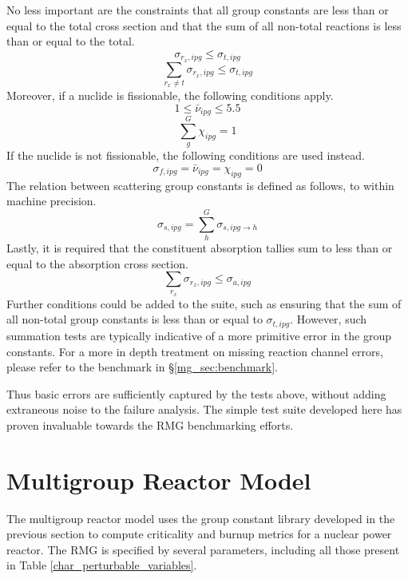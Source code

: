 No less important are the constraints that all group constants are less than or equal to 
the total cross section and that the sum of all non-total reactions is less than or equal
to the total.
\begin{equation}
\label{tot_xs_ut}
\sigma_{r_x,ipg} \le \sigma_{t,ipg}
\end{equation}
\begin{equation}
\label{tot_xs_sum}
\sum_{r_x \ne t}\sigma_{r_x,ipg} \le \sigma_{t,ipg}
\end{equation}
Moreover, if a nuclide is fissionable, the following conditions apply.
\begin{equation}
\label{nu_fiss_ut}
1 \le \bar{\nu}_{ipg} \le 5.5
\end{equation}
\begin{equation}
\label{chi_fiss_ut}
\sum_g^G \chi_{ipg} = 1
\end{equation}
If the nuclide is not fissionable, the following conditions are used instead.
\begin{equation}
\label{not_fiss_ut}
\sigma_{f,ipg} = \bar{\nu}_{ipg} = \chi_{ipg} = 0
\end{equation}
The relation between scattering group constants is defined as follows, to 
within machine precision.
\begin{equation}
\label{scat_xs_ut}
\sigma_{s,ipg} = \sum_h^G \sigma_{s,ipg\to h}
\end{equation}
Lastly, it is required that the constituent absorption tallies sum 
to less than or equal to the absorption cross section.
\begin{equation}
\label{sum_xs_ut}
\sum_{r_x} \sigma_{r_x,ipg} \le \sigma_{a,ipg}
\end{equation}
Further conditions could be added to the suite, such as ensuring that the sum of 
all non-total group constants is less than or equal to $\sigma_{t,ipg}$.  However, 
such summation tests are typically indicative of a more primitive error in the 
group constants.  
For a more in depth treatment on missing reaction channel errors, please refer to the 
benchmark in \S \ref{mg_sec:benchmark}.

Thus basic errors are sufficiently captured by the tests above, 
without adding extraneous noise to the failure analysis.  The simple test suite developed
here has proven invaluable towards the RMG benchmarking efforts.




\section{Multigroup Reactor Model}
\label{mg_sec:rmg_model}
The multigroup reactor model uses the group constant library developed in the previous 
section to compute criticality and burnup metrics for a nuclear power reactor.
The RMG is specified by several parameters, including all those present in Table
\ref{char_perturbable_variables}.

